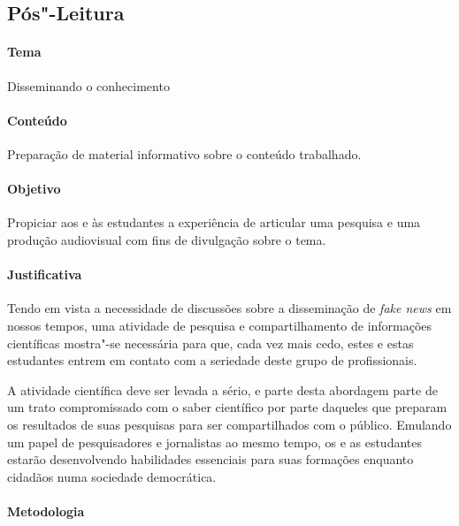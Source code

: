 \documentclass[11pt]{extarticle}
\begin{document}
\subsection{Pós"-Leitura}

\paragraph{Tema} Disseminando o conhecimento

\paragraph{Conteúdo} Preparação de material informativo sobre o conteúdo trabalhado.

\paragraph{Objetivo} Propiciar aos e às estudantes a experiência de articular
uma pesquisa e uma produção audiovisual com fins de divulgação sobre o tema.

\paragraph{Justificativa} Tendo em vista a necessidade de discussões sobre
a disseminação de \textit{fake news} em nossos tempos, uma atividade de pesquisa
e compartilhamento de informações científicas mostra"-se necessária para que,
cada vez mais cedo, estes e estas estudantes entrem em contato com a seriedade
deste grupo de profissionais. 

A atividade científica deve ser levada a sério,
e parte desta abordagem parte de um trato compromissado com o saber científico
por parte daqueles que preparam os resultados de suas pesquisas para
ser compartilhados com o público. Emulando um papel de pesquisadores
e jornalistas ao mesmo tempo, os e as estudantes estarão desenvolvendo
habilidades essenciais para suas formações enquanto cidadãos numa sociedade
democrática. 

\paragraph{Metodologia} 
\end{document}
